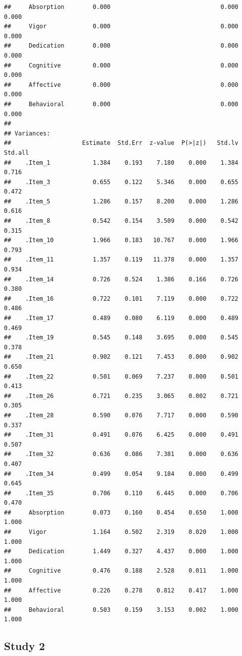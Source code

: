 \documentclass[
  english,
  man]{apa6}
\begin{document}
\begin{verbatim}
##     Absorption        0.000                               0.000    0.000
##     Vigor             0.000                               0.000    0.000
##     Dedication        0.000                               0.000    0.000
##     Cognitive         0.000                               0.000    0.000
##     Affective         0.000                               0.000    0.000
##     Behavioral        0.000                               0.000    0.000
## 
## Variances:
##                    Estimate  Std.Err  z-value  P(>|z|)   Std.lv  Std.all
##    .Item_1            1.384    0.193    7.180    0.000    1.384    0.716
##    .Item_3            0.655    0.122    5.346    0.000    0.655    0.472
##    .Item_5            1.286    0.157    8.200    0.000    1.286    0.616
##    .Item_8            0.542    0.154    3.509    0.000    0.542    0.315
##    .Item_10           1.966    0.183   10.767    0.000    1.966    0.793
##    .Item_11           1.357    0.119   11.378    0.000    1.357    0.934
##    .Item_14           0.726    0.524    1.386    0.166    0.726    0.380
##    .Item_16           0.722    0.101    7.119    0.000    0.722    0.486
##    .Item_17           0.489    0.080    6.119    0.000    0.489    0.469
##    .Item_19           0.545    0.148    3.695    0.000    0.545    0.378
##    .Item_21           0.902    0.121    7.453    0.000    0.902    0.650
##    .Item_22           0.501    0.069    7.237    0.000    0.501    0.413
##    .Item_26           0.721    0.235    3.065    0.002    0.721    0.305
##    .Item_28           0.590    0.076    7.717    0.000    0.590    0.337
##    .Item_31           0.491    0.076    6.425    0.000    0.491    0.507
##    .Item_32           0.636    0.086    7.381    0.000    0.636    0.407
##    .Item_34           0.499    0.054    9.184    0.000    0.499    0.645
##    .Item_35           0.706    0.110    6.445    0.000    0.706    0.470
##     Absorption        0.073    0.160    0.454    0.650    1.000    1.000
##     Vigor             1.164    0.502    2.319    0.020    1.000    1.000
##     Dedication        1.449    0.327    4.437    0.000    1.000    1.000
##     Cognitive         0.476    0.188    2.528    0.011    1.000    1.000
##     Affective         0.226    0.278    0.812    0.417    1.000    1.000
##     Behavioral        0.503    0.159    3.153    0.002    1.000    1.000
\end{verbatim}

\hypertarget{study-2}{%
\subsection{Study 2}\label{study-2}}
\end{document}
